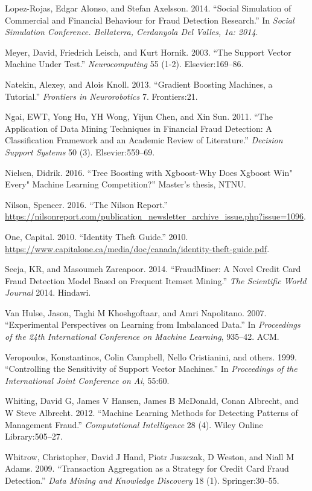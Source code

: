 \documentclass[12pt,]{article}
\begin{document}
\leavevmode\hypertarget{ref-lopez2014social}{}%
Lopez-Rojas, Edgar Alonso, and Stefan Axelsson. 2014. ``Social
Simulation of Commercial and Financial Behaviour for Fraud Detection
Research.'' In \emph{Social Simulation Conference. Bellaterra,
Cerdanyola Del Valles, 1a: 2014}.

\leavevmode\hypertarget{ref-meyer2003support}{}%
Meyer, David, Friedrich Leisch, and Kurt Hornik. 2003. ``The Support
Vector Machine Under Test.'' \emph{Neurocomputing} 55 (1-2).
Elsevier:169--86.

\leavevmode\hypertarget{ref-natekin2013gradient}{}%
Natekin, Alexey, and Alois Knoll. 2013. ``Gradient Boosting Machines, a
Tutorial.'' \emph{Frontiers in Neurorobotics} 7. Frontiers:21.

\leavevmode\hypertarget{ref-ngai2011application}{}%
Ngai, EWT, Yong Hu, YH Wong, Yijun Chen, and Xin Sun. 2011. ``The
Application of Data Mining Techniques in Financial Fraud Detection: A
Classification Framework and an Academic Review of Literature.''
\emph{Decision Support Systems} 50 (3). Elsevier:559--69.

\leavevmode\hypertarget{ref-nielsen2016tree}{}%
Nielsen, Didrik. 2016. ``Tree Boosting with Xgboost-Why Does Xgboost
Win" Every" Machine Learning Competition?'' Master's thesis, NTNU.

\leavevmode\hypertarget{ref-nilson2016nilson}{}%
Nilson, Spencer. 2016. ``The Nilson Report.''
\url{https://nilsonreport.com/publication_newsletter_archive_issue.php?issue=1096}.

\leavevmode\hypertarget{ref-capitaloneguide}{}%
One, Capital. 2010. ``Identity Theft Guide.'' 2010.
\url{https://www.capitalone.ca/media/doc/canada/identity-theft-guide.pdf}.

\leavevmode\hypertarget{ref-seeja2014fraudminer}{}%
Seeja, KR, and Masoumeh Zareapoor. 2014. ``FraudMiner: A Novel Credit
Card Fraud Detection Model Based on Frequent Itemset Mining.'' \emph{The
Scientific World Journal} 2014. Hindawi.

\leavevmode\hypertarget{ref-van2007experimental}{}%
Van Hulse, Jason, Taghi M Khoshgoftaar, and Amri Napolitano. 2007.
``Experimental Perspectives on Learning from Imbalanced Data.'' In
\emph{Proceedings of the 24th International Conference on Machine
Learning}, 935--42. ACM.

\leavevmode\hypertarget{ref-veropoulos1999controlling}{}%
Veropoulos, Konstantinos, Colin Campbell, Nello Cristianini, and others.
1999. ``Controlling the Sensitivity of Support Vector Machines.'' In
\emph{Proceedings of the International Joint Conference on Ai}, 55:60.

\leavevmode\hypertarget{ref-whiting2012machine}{}%
Whiting, David G, James V Hansen, James B McDonald, Conan Albrecht, and
W Steve Albrecht. 2012. ``Machine Learning Methods for Detecting
Patterns of Management Fraud.'' \emph{Computational Intelligence} 28
(4). Wiley Online Library:505--27.

\leavevmode\hypertarget{ref-whitrow2009transaction}{}%
Whitrow, Christopher, David J Hand, Piotr Juszczak, D Weston, and Niall
M Adams. 2009. ``Transaction Aggregation as a Strategy for Credit Card
Fraud Detection.'' \emph{Data Mining and Knowledge Discovery} 18 (1).
Springer:30--55.
\end{document}
